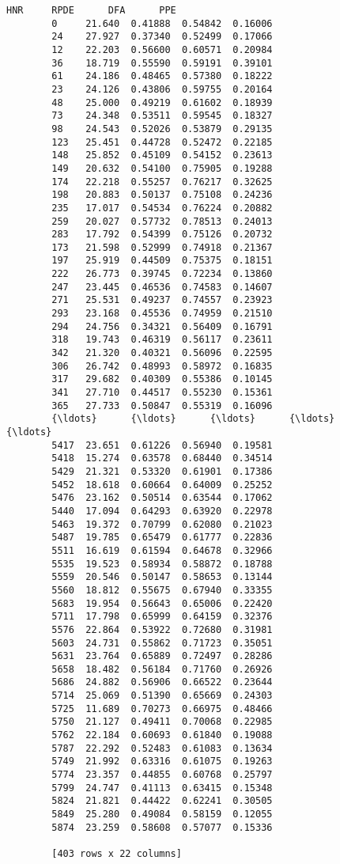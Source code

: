 \documentclass[11pt]{article}
\begin{document}
\begin{Verbatim}[commandchars=\\\{\}]
                 HNR     RPDE      DFA      PPE  
        0     21.640  0.41888  0.54842  0.16006  
        24    27.927  0.37340  0.52499  0.17066  
        12    22.203  0.56600  0.60571  0.20984  
        36    18.719  0.55590  0.59191  0.39101  
        61    24.186  0.48465  0.57380  0.18222  
        23    24.126  0.43806  0.59755  0.20164  
        48    25.000  0.49219  0.61602  0.18939  
        73    24.348  0.53511  0.59545  0.18327  
        98    24.543  0.52026  0.53879  0.29135  
        123   25.451  0.44728  0.52472  0.22185  
        148   25.852  0.45109  0.54152  0.23613  
        149   20.632  0.54100  0.75905  0.19288  
        174   22.218  0.55257  0.76217  0.32625  
        198   20.883  0.50137  0.75108  0.24236  
        235   17.017  0.54534  0.76224  0.20882  
        259   20.027  0.57732  0.78513  0.24013  
        283   17.792  0.54399  0.75126  0.20732  
        173   21.598  0.52999  0.74918  0.21367  
        197   25.919  0.44509  0.75375  0.18151  
        222   26.773  0.39745  0.72234  0.13860  
        247   23.445  0.46536  0.74583  0.14607  
        271   25.531  0.49237  0.74557  0.23923  
        293   23.168  0.45536  0.74959  0.21510  
        294   24.756  0.34321  0.56409  0.16791  
        318   19.743  0.46319  0.56117  0.23611  
        342   21.320  0.40321  0.56096  0.22595  
        306   26.742  0.48993  0.58972  0.16835  
        317   29.682  0.40309  0.55386  0.10145  
        341   27.710  0.44517  0.55230  0.15361  
        365   27.733  0.50847  0.55319  0.16096  
        {\ldots}      {\ldots}      {\ldots}      {\ldots}      {\ldots}  
        5417  23.651  0.61226  0.56940  0.19581  
        5418  15.274  0.63578  0.68440  0.34514  
        5429  21.321  0.53320  0.61901  0.17386  
        5452  18.618  0.60664  0.64009  0.25252  
        5476  23.162  0.50514  0.63544  0.17062  
        5440  17.094  0.64293  0.63920  0.22978  
        5463  19.372  0.70799  0.62080  0.21023  
        5487  19.785  0.65479  0.61777  0.22836  
        5511  16.619  0.61594  0.64678  0.32966  
        5535  19.523  0.58934  0.58872  0.18788  
        5559  20.546  0.50147  0.58653  0.13144  
        5560  18.812  0.55675  0.67940  0.33355  
        5683  19.954  0.56643  0.65006  0.22420  
        5711  17.798  0.65999  0.64159  0.32376  
        5576  22.864  0.53922  0.72680  0.31981  
        5603  24.731  0.55862  0.71723  0.35051  
        5631  23.764  0.65889  0.72497  0.28286  
        5658  18.482  0.56184  0.71760  0.26926  
        5686  24.882  0.56906  0.66522  0.23644  
        5714  25.069  0.51390  0.65669  0.24303  
        5725  11.689  0.70273  0.66975  0.48466  
        5750  21.127  0.49411  0.70068  0.22985  
        5762  22.184  0.60693  0.61840  0.19088  
        5787  22.292  0.52483  0.61083  0.13634  
        5749  21.992  0.63316  0.61075  0.19263  
        5774  23.357  0.44855  0.60768  0.25797  
        5799  24.747  0.41113  0.63415  0.15348  
        5824  21.821  0.44422  0.62241  0.30505  
        5849  25.280  0.49084  0.58159  0.12055  
        5874  23.259  0.58608  0.57077  0.15336  
        
        [403 rows x 22 columns]
\end{Verbatim}
            
\end{document}
